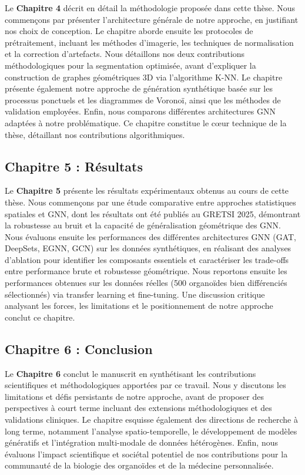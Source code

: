 Le \textbf{Chapitre 4} décrit en détail la méthodologie proposée dans cette thèse. Nous commençons par présenter l'architecture générale de notre approche, en justifiant nos choix de conception. Le chapitre aborde ensuite les protocoles de prétraitement, incluant les méthodes d'imagerie, les techniques de normalisation et la correction d'artefacts. Nous détaillons nos deux contributions méthodologiques pour la segmentation optimisée, avant d'expliquer la construction de graphes géométriques 3D via l'algorithme K-NN. Le chapitre présente également notre approche de génération synthétique basée sur les processus ponctuels et les diagrammes de Voronoï, ainsi que les méthodes de validation employées. Enfin, nous comparons différentes architectures GNN adaptées à notre problématique. Ce chapitre constitue le cœur technique de la thèse, détaillant nos contributions algorithmiques.

\subsection{Chapitre 5 : Résultats}

Le \textbf{Chapitre 5} présente les résultats expérimentaux obtenus au cours de cette thèse. Nous commençons par une étude comparative entre approches statistiques spatiales et GNN, dont les résultats ont été publiés au GRETSI 2025, démontrant la robustesse au bruit et la capacité de généralisation géométrique des GNN. Nous évaluons ensuite les performances des différentes architectures GNN (GAT, DeepSets, EGNN, GCN) sur les données synthétiques, en réalisant des analyses d'ablation pour identifier les composants essentiels et caractériser les trade-offs entre performance brute et robustesse géométrique. Nous reportons ensuite les performances obtenues sur les données réelles (500 organoïdes bien différenciés sélectionnés) via transfer learning et fine-tuning. Une discussion critique analysant les forces, les limitations et le positionnement de notre approche conclut ce chapitre.

\subsection{Chapitre 6 : Conclusion}

Le \textbf{Chapitre 6} conclut le manuscrit en synthétisant les contributions scientifiques et méthodologiques apportées par ce travail. Nous y discutons les limitations et défis persistants de notre approche, avant de proposer des perspectives à court terme incluant des extensions méthodologiques et des validations cliniques. Le chapitre esquisse également des directions de recherche à long terme, notamment l'analyse spatio-temporelle, le développement de modèles génératifs et l'intégration multi-modale de données hétérogènes. Enfin, nous évaluons l'impact scientifique et sociétal potentiel de nos contributions pour la communauté de la biologie des organoïdes et de la médecine personnalisée.

